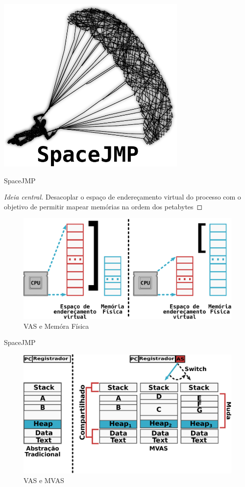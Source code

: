 \documentclass[xcolor={usenames,svgnames,dvipsnames},brazil,english,12pt,aspectratio=149]{beamer}
\begin{document}
\begin{frame}[plain]
  \includegraphics[width=0.7\textwidth]{presentation_cap2_seven}
\end{frame}

\begin{frame}{SpaceJMP}

  \begin{proof}[Ideia central]
Desacoplar o espaço de endereçamento virtual do processo com o objetivo de
permitir mapear memórias na ordem dos petabytes
  \end{proof}

  \begin{figure}[!h]
    \centering
    \includegraphics[width=.5\textwidth]{vas_vs_physical_address} 
    \caption*{VAS e Memóra Física}
  \end{figure}

\end{frame}

\begin{frame}{SpaceJMP}
  \begin{figure}[!h]
    \centering
    \includegraphics[width=.7\textwidth]{traditional_vs_mvas} 
    \caption*{VAS e MVAS}
  \end{figure}
\end{frame}
\end{document}
